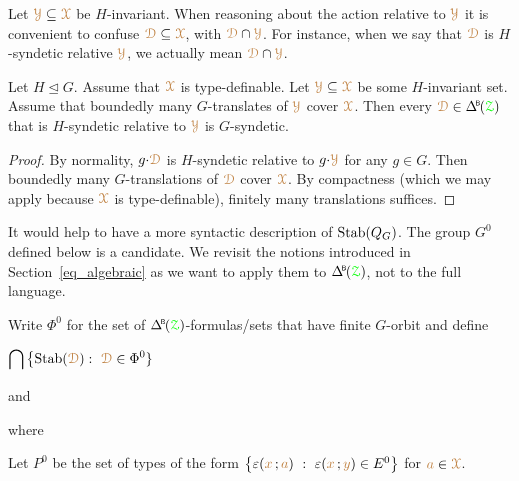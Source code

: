
Let ${\color{brown}\EuScript Y}\subseteq{\color{brown}\EuScript X}$ be $H$-invariant.
When reasoning about the action relative to ${\color{brown}\EuScript Y}$ it is convenient to confuse ${\color{brown}\EuScript D}\subseteq{\color{brown}\EuScript X}$, with ${\color{brown}\EuScript D}\cap{\color{brown}\EuScript Y}$.
For instance, when we say that ${\color{brown}\EuScript D}$ is $H$-syndetic relative ${\color{brown}\EuScript Y}$, we actually mean ${\color{brown}\EuScript D}\cap{\color{brown}\EuScript Y}$.

\begin{proposition}\label{prop_HgenGgen}
  Let $H\trianglelefteq G$.
  Assume that ${\color{brown}\EuScript X}$ is type-definable.
  Let ${\color{brown}\EuScript Y}\subseteq{\color{brown}\EuScript X}$ be some $H$-invariant set.
  Assume that boundedly many $G$-translates of ${\color{brown}\EuScript Y}$ cover ${\color{brown}\EuScript X}$.
  Then every $\mrD\in\BDelta(\grZ)$ that is $H$-syndetic relative to ${\color{brown}\EuScript Y}$ is $G$-syndetic.
\end{proposition}

\begin{proof}
%
  By normality, $g{\cdot}{\color{brown}\EuScript D}$ is $H$-syndetic relative to $g{\cdot}{\color{brown}\EuScript Y}$ for any $g\in G$.
  Then boundedly many $G$-translations of ${\color{brown}\EuScript D}$ cover ${\color{brown}\EuScript X}$.
  By compactness (which we may apply because ${\color{brown}\EuScript X}$ is type-definable), finitely many translations suffices.
\end{proof}

It would help to have a more syntactic description of ${\rm Stab}(Q_G)$.
The group $G^0$ defined below is a candidate. %
We revisit the notions introduced in Section~\ref{eq_algebraic} as we want to apply them to $\BDelta(\grZ)$, not to the full language.%

\begin{definition}\label{def_G0}
  Write \emph{$\Phi^0$\/} for the set of $\BDelta(\grZ)$-formulas/sets that have finite $G$-orbit and define%

  \medrel{=}$\displaystyle\bigcap\big\{{\rm Stab}({\color{brown}\EuScript D}) :\  {\color{brown}\EuScript D}\in\Phi^0\}$

  and%

  
  where%


  Let $P^0$ be the set of types of the form $\big\{\varepsilon({\color{brown} x}\,;{\color{brown} a})\ :\ \varepsilon({\color{brown} x}\,;{\color{brown} y})\in E^0\big\}$ for ${\color{brown} a}\in{\color{brown}\EuScript X}$.
\end{definition}

